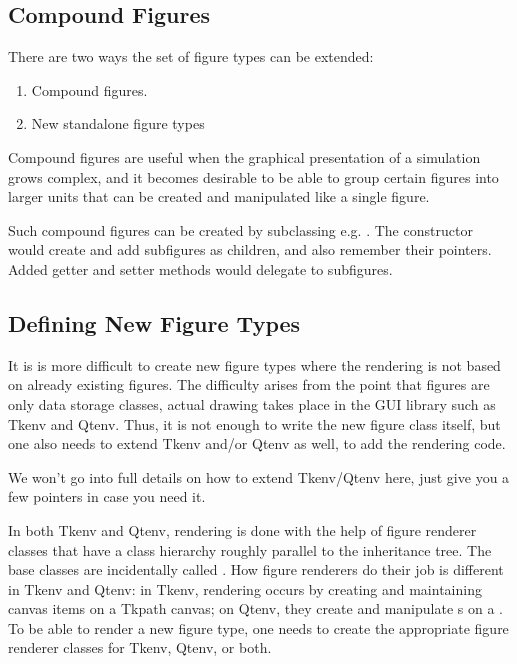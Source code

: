 \subsection{Compound Figures}

There are two ways the set of figure types can be extended:

\begin{enumerate}
  \item Compound figures.
  \item New standalone figure types
\end{enumerate}

Compound figures are useful when the graphical presentation of a simulation
grows complex, and it becomes desirable to be able to group certain figures
into larger units that can be created and manipulated like a single figure.

Such compound figures can be created by subclassing e.g. .
The constructor would create and add subfigures as children, and also remember
their pointers. Added getter and setter methods would delegate to subfigures.


\subsection{Defining New Figure Types}

It is is more difficult to create new figure types where the rendering is not
based on already existing figures. The difficulty arises from the point that
figures are only data storage classes, actual drawing takes place in the
GUI library such as Tkenv and Qtenv. Thus, it is not enough to write the new
figure class itself, but one also needs to extend Tkenv and/or Qtenv as well,
to add the rendering code.

We won't go into full details on how to extend Tkenv/Qtenv here, just give
you a few pointers in case you need it.

In both Tkenv and Qtenv, rendering is done with the help of figure renderer
classes that have a class hierarchy roughly parallel to the
 inheritance tree. The base classes are incidentally called
. How figure renderers do their job is different in
Tkenv and Qtenv: in Tkenv, rendering occurs by creating and maintaining
canvas items on a Tkpath canvas; on Qtenv, they create and manipulate
s on a . To be able to render a
new figure type, one needs to create the appropriate figure renderer
classes for Tkenv, Qtenv, or both.

